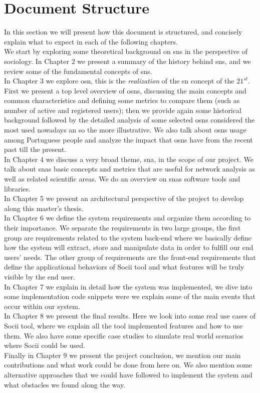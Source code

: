 \section{Document Structure}
In this section we will present how this document is structured, and concisely explain what to expect in each of the following chapters.\\
\indent We start by exploring some theoretical background on \glspl{sn} in the perspective of sociology. In Chapter 2 we present a summary of the history behind \glspl{sn}, and we review some of the fundamental concepts of \glspl{sn}.\\
\indent In Chapter 3 we explore \acrfull{osn}, this is the \textit{realization} of the \gls{sn} concept of the $21^{st}$. First we present a top level overview of \glspl{osn}, discussing the main concepts and common characteristics and defining some metrics to compare them (such as number of active and registered users); then we provide again some historical background followed by the detailed analysis of some selected \glspl{osn} considered the most used nowadays an so the more illustrative. We also talk about \glspl{osn} usage among Portuguese people and analyze the impact that \glspl{osn} have from the recent past till the present.\\
\indent In Chapter 4 we discuss a very broad theme, \acrfull{sna}, in the scope of our project. We talk about \glspl{sna} basic concepts and metrics that are useful for network analysis as well as related scientific areas. We do an overview on \glspl{sna} software tools and libraries.\\
\indent In Chapter 5 we present an architectural perspective of the project to develop along this master's thesis.\\
\indent In Chapter 6 we define the system requirements and organize them according to their importance. We separate the requirements in two large groups, the first group are requirements related to the system back-end where we basically define how the system will extract, store and manipulate data in order to fulfill our end users' needs. The other group of requirements are the front-end requirements that define the applicational behaviors of Socii tool and what features will be truly visible by the end user.\\
\indent In Chapter 7 we explain in detail how the system was implemented, we dive into some implementation code snippets were we explain some of the main events that occur within our system.\\
\indent In Chapter 8 we present the final results. Here we look into some real use cases of Socii tool, where we explain all the tool implemented features and how to use them. We also have some specific case studies to simulate real world scenarios where Socii could be used.\\
\indent Finally in Chapter 9 we present the project conclusion, we mention our main contributions and what work could be done from here on. We also mention some alternative approaches that we could have followed to implement the system and what obstacles we found along the way.
